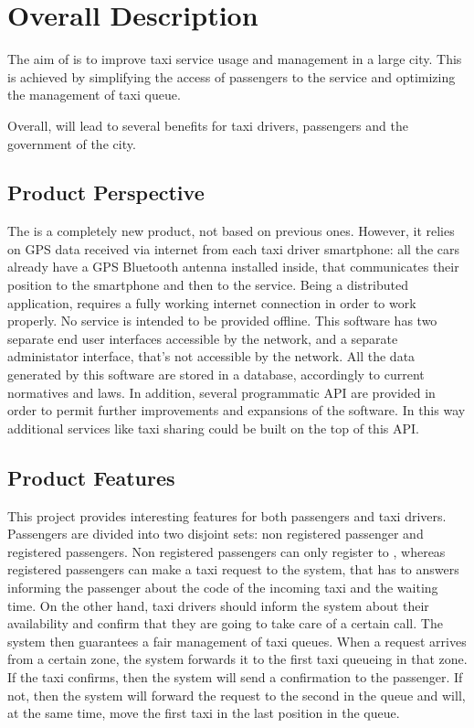 \section{Overall Description}
The aim of \myTaxiService{} is to improve taxi service usage and management in a large city.
This is achieved by simplifying the access of passengers to the service and optimizing the management of taxi queue.\par
Overall, \myTaxiService{} will lead to several benefits for taxi drivers, passengers and the government of the city.
\subsection{Product Perspective}
The \myTaxiService{} is a completely new product, not based on previous ones.
However, it relies on GPS data received via internet from each taxi driver smartphone: all the cars already have a GPS Bluetooth antenna installed inside, that communicates their position to the smartphone and then to the service.
Being a distributed application, \myTaxiService{} requires a fully working internet connection in order to work properly.
No service is intended to be provided offline.
This software has two separate end user interfaces accessible by the network, and a separate administator interface, that's not accessible by the network.
All the data generated by this software are stored in a database, accordingly to current normatives and laws.
In addition, several programmatic API are provided in order to permit further improvements and expansions of the software.
In this way additional services like taxi sharing could be built on the top of this API.
\subsection{Product Features}
This project provides interesting features for both passengers and taxi drivers.
Passengers are divided into two disjoint sets: non registered passenger and registered passengers.
Non registered passengers can only register to \myTaxiService{}, whereas registered passengers can make a taxi request to the system, that has to answers informing the passenger about the code of the incoming taxi and the waiting time.
On the other hand, taxi drivers should inform the system about their availability and confirm that they are going to take care of a certain call.
The system then guarantees a fair management of taxi queues.
When a request arrives from a certain zone, the system forwards it to the first taxi queueing in that zone.
If the taxi confirms, then the system will send a confirmation to the passenger.
If not, then the system will forward the request to the second in the queue and will, at the same time, move the first taxi in the last position in the queue.

